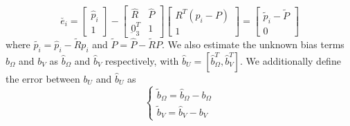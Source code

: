 \documentclass[12pt]{article}
\def\omani#1{\breve{#1}}
\begin{document}
\begin{equation}
    \omani{e_i} = \begin{bmatrix}
        \hat p_i \\ 1
    \end{bmatrix} - 
    \begin{bmatrix}
        \hat R & \hat P \\
        \underbar{0}_3^T & 1
    \end{bmatrix}
    \begin{bmatrix}
        R^T(p_i - P) \\ 1
    \end{bmatrix} = 
    \begin{bmatrix}
        \tilde p_i - \tilde{P} \\ 0
    \end{bmatrix} 
\end{equation}
where $\tilde{p_i} = \hat p_i - \tilde{R}p_i$ and $\tilde{P} = \hat P - \tilde{R}P$.
We also estimate the unknown bias terms $b_{\Omega}$ and $b_V$ as $\hat b_{\Omega}$ and $\hat b_V$ respectively, with $\hat b_U = [\hat b_\Omega^T , \hat b_V^T]$. We 
additionally define the error between $b_U$ and $\hat b_U$ as 
\begin{equation}
    \begin{cases}
        \tilde b_{\Omega} = \hat b_{\Omega} - b_{\Omega} \\
        \tilde b_V = \hat b_V - b_V
    \end{cases}
\end{equation}
\end{document}
